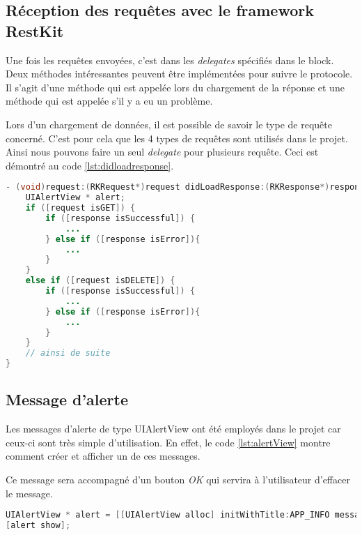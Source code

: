 \subsection{Réception des requêtes avec le framework RestKit} %
\label{sub:reception_des_requ_tes_avec_le_framework_restkit}

Une fois les requêtes envoyées, c'est dans les \emph{delegates} spécifiés dans le block. Deux méthodes intéressantes peuvent être implémentées pour suivre le protocole. Il s'agit d'une méthode qui est appelée lors du chargement de la réponse et une méthode qui est appelée s'il y a eu un problème.

\medskip

Lors d'un chargement de données, il est possible de savoir le type de requête concerné. C'est pour cela que les 4 types de requêtes sont utilisés dans le projet. Ainsi nous pouvons faire un seul \emph{delegate} pour plusieurs requête. Ceci est démontré au code \ref{lst:didloadresponse}.

\begin{lstlisting}[language={JAVA}, caption={Méthode du delegate pour le chargement des données}, label={lst:didloadresponse}]
- (void)request:(RKRequest*)request didLoadResponse:(RKResponse*)response { 
    UIAlertView * alert;
    if ([request isGET]) {
        if ([response isSuccessful]) {
        	...    
        } else if ([response isError]){
         	...   
        }
    }
    else if ([request isDELETE]) {
        if ([response isSuccessful]) {
        	...
        } else if ([response isError]){
        	...
        }
    }
    // ainsi de suite
}
\end{lstlisting}


\subsection{Message d'alerte} %
\label{sub:message_d_alerte}
Les messages d'alerte de type UIAlertView ont été employés dans le projet car ceux-ci sont très simple d'utilisation. En effet, le code \ref{lst:alertView} montre comment créer et afficher un de ces messages.

\medskip

Ce message sera accompagné d'un bouton \emph{OK} qui servira à l'utilisateur d'effacer le message.

\begin{lstlisting}[language={JAVA}, caption={Message d'alerte}, label={lst:alertView}]
UIAlertView * alert = [[UIAlertView alloc] initWithTitle:APP_INFO message:HOUSE_SAVED delegate:nil cancelButtonTitle:BUTTON_OK otherButtonTitles: nil];
[alert show]; 
\end{lstlisting}

